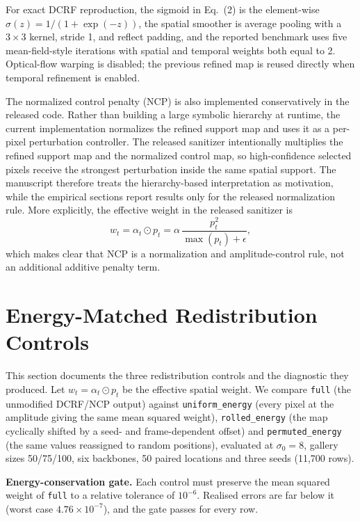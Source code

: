 \documentclass[10pt,journal]{IEEEtran}
\begin{document}
For exact DCRF reproduction, the sigmoid in Eq.~(2) is the element-wise
$\sigma(z)=1/(1+\exp(-z))$, the spatial smoother is average pooling with a
$3\times3$ kernel, stride 1, and reflect padding, and the reported benchmark
uses five mean-field-style iterations with spatial and temporal weights both
equal to 2. Optical-flow warping is disabled; the previous refined map is
reused directly when temporal refinement is enabled.

The normalized control penalty (NCP) is also implemented conservatively in the released code. Rather than building a large symbolic hierarchy at runtime, the current implementation normalizes the refined support map and uses it as a per-pixel perturbation controller. The released sanitizer intentionally multiplies the refined support map and the normalized control map, so high-confidence selected pixels receive the strongest perturbation inside the same spatial support. The manuscript therefore treats the hierarchy-based interpretation as motivation, while the empirical sections report results only for the released normalization rule.
More explicitly, the effective weight in the released sanitizer is
\begin{equation}
\label{eq:appendix_effective_weight}
w_t=\alpha_t\odot p_t
    =\alpha\,\frac{p_t^2}{\max(p_t)+\epsilon},
\end{equation}
which makes clear that NCP is a normalization and amplitude-control rule,
not an additional additive penalty term.


\section{Energy-Matched Redistribution Controls}
\label{sec:spatial_causality}

This section documents the three redistribution controls and the diagnostic
they produced. Let $w_t=\alpha_t\odot p_t$ be the effective spatial weight. We
compare \texttt{full} (the unmodified DCRF/NCP output) against
\texttt{uniform\_energy} (every pixel at the amplitude giving the same mean
squared weight), \texttt{rolled\_energy} (the map cyclically shifted by a
seed- and frame-dependent offset) and \texttt{permuted\_energy} (the same
values reassigned to random positions), evaluated at $\sigma_0=8$, gallery
sizes 50/75/100, six backbones, 50 paired locations and three seeds
(11,700 rows).

\textbf{Energy-conservation gate.} Each control must preserve the mean squared
weight of \texttt{full} to a relative tolerance of $10^{-6}$. Realised errors
are far below it (worst case $4.76\times10^{-7}$), and the gate passes for
every row.
\end{document}
